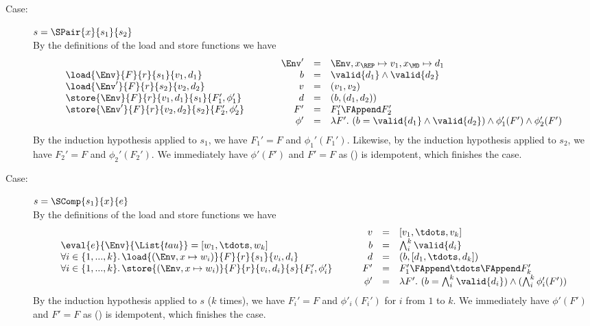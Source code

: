 {\begin{description}
\item[Case:]$s = \SPair{x}{s_1}{s_2}$\\[1ex]
%
By the definitions of the load and store functions we have 
\[ 
\begin{array}{l}
\load{\Env}{F}{r}{s_1}{v_1,d_1}\\
\load{\Env'}{F}{r}{s_2}{v_2,d_2}\\
\store{\Env}{F}{r}{v_1,d_1}{s_1}{F_1',\phi_1'}\\
\store{\Env'}{F}{r}{v_2,d_2}{s_2}{F_2',\phi_2'}\\
\end{array} \hspace*{1cm}
\begin{array}{rcl}
\Env' &=& \Env,x_{\REP} \mapsto v_1, x_{\MD} \mapsto d_1\\
b &= & \valid{d_1} \wedge \valid{d_2}\\
v &=& (v_1,v_2)\\
d &=& (b,(d_1,d_2))\\
F' &=& F_1' \FAppend F_2'\\
\phi' &=& \lambda F'.~(b = \valid{d_1} \wedge \valid{d_2}) \wedge \phi_1'(F') \wedge \phi_2'(F')\\
\end{array}
\]
By the induction hypothesis applied to $s_1$, we have $F_1' = F$ and
$\phi_1'(F_1')$. Likewise, by the induction hypothesis applied to
$s_2$, we have $F_2' = F$ and $\phi_2'(F_2')$. We immediately have
$\phi'(F')$ and $F' = F$ as (\FAppend) is idempotent, which finishes
the case.

\item[Case:] $s = \SComp{s_1}{x}{e}$\\[1ex]
%
By the definitions of the load and store functions we have 
\[ 
\begin{array}{l}
\eval{e}{\Env}{\List{tau}} = [w_1,\tdots,w_k ]\\
\forall i \in \{1,...,k\}.\,\load{(\Env, x \mapsto w_i)}{F}{r}{s_1}{v_i,d_i}\\
\forall i \in \{1,...,k\}.\,\store{(\Env, x \mapsto w_i)}{F}{r}{v_i,d_i}{s}{F_i',\phi_i'}\\
\end{array}\hspace*{.75cm}\begin{array}{rcl}
v &=& [v_1,\tdots,v_k]\\
b &= &\bigwedge_i^k \valid{d_i}\\
d &=& (b,[d_1,\tdots,d_k])\\
F' &=& F_1' \FAppend \tdots \FAppend F_k'\\
\phi' &=& \lambda F'.~(b = \bigwedge_i^k \valid{d_i}) \wedge (\bigwedge_i^k \phi_i'(F'))\\
\end{array}
\]
By the induction hypothesis applied to $s$ ($k$ times), we have $F_i'
= F$ and $\phi'_i(F_i')$ for $i$ from $1$ to $k$. We immediately have
$\phi'(F')$ and $F' = F$ as (\FAppend) is idempotent, which finishes
the case.


\end{description}}
